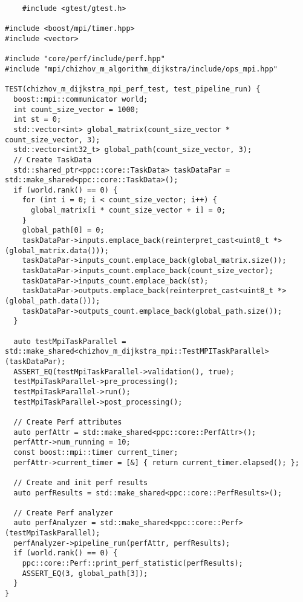 \documentclass[a4paper, 14pt]{extarticle}
\begin{document}
\begin{lstlisting}
    #include <gtest/gtest.h>

#include <boost/mpi/timer.hpp>
#include <vector>

#include "core/perf/include/perf.hpp"
#include "mpi/chizhov_m_algorithm_dijkstra/include/ops_mpi.hpp"

TEST(chizhov_m_dijkstra_mpi_perf_test, test_pipeline_run) {
  boost::mpi::communicator world;
  int count_size_vector = 1000;
  int st = 0;
  std::vector<int> global_matrix(count_size_vector * count_size_vector, 3);
  std::vector<int32_t> global_path(count_size_vector, 3);
  // Create TaskData
  std::shared_ptr<ppc::core::TaskData> taskDataPar = std::make_shared<ppc::core::TaskData>();
  if (world.rank() == 0) {
    for (int i = 0; i < count_size_vector; i++) {
      global_matrix[i * count_size_vector + i] = 0;
    }
    global_path[0] = 0;
    taskDataPar->inputs.emplace_back(reinterpret_cast<uint8_t *>(global_matrix.data()));
    taskDataPar->inputs_count.emplace_back(global_matrix.size());
    taskDataPar->inputs_count.emplace_back(count_size_vector);
    taskDataPar->inputs_count.emplace_back(st);
    taskDataPar->outputs.emplace_back(reinterpret_cast<uint8_t *>(global_path.data()));
    taskDataPar->outputs_count.emplace_back(global_path.size());
  }

  auto testMpiTaskParallel = std::make_shared<chizhov_m_dijkstra_mpi::TestMPITaskParallel>(taskDataPar);
  ASSERT_EQ(testMpiTaskParallel->validation(), true);
  testMpiTaskParallel->pre_processing();
  testMpiTaskParallel->run();
  testMpiTaskParallel->post_processing();

  // Create Perf attributes
  auto perfAttr = std::make_shared<ppc::core::PerfAttr>();
  perfAttr->num_running = 10;
  const boost::mpi::timer current_timer;
  perfAttr->current_timer = [&] { return current_timer.elapsed(); };

  // Create and init perf results
  auto perfResults = std::make_shared<ppc::core::PerfResults>();

  // Create Perf analyzer
  auto perfAnalyzer = std::make_shared<ppc::core::Perf>(testMpiTaskParallel);
  perfAnalyzer->pipeline_run(perfAttr, perfResults);
  if (world.rank() == 0) {
    ppc::core::Perf::print_perf_statistic(perfResults);
    ASSERT_EQ(3, global_path[3]);
  }
}


\end{lstlisting}
\end{document}
